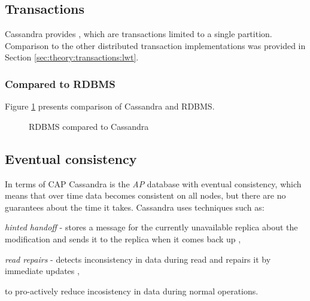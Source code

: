 \subsection{Transactions}
Cassandra provides \lwt, which are transactions limited to a single partition.
Comparison to the other distributed transaction implementations was provided in Section \ref{sec:theory:transactions:lwt}.

\subsubsection{Compared to RDBMS}
Figure \ref{fig:cassandraToRdbms} presents comparison of Cassandra and RDBMS.
\begin{figure}[H]
  \setlength{\unitlength}{1.3cm}  
  \caption{RDBMS compared to Cassandra}
  \label{fig:cassandraToRdbms}
\end{figure}

\subsection{Eventual consistency}\label{sec:theory:eventualConsistency}
In terms of CAP \cite{brewer2000towards} \cite{Brewer:2012ba} Cassandra is the \emph{AP} database with eventual consistency, which means that over time data becomes consistent on all nodes, but there are no guarantees about the time it takes. Cassandra uses techniques such as: \begin{enumerate*}[label=\alph*)]
\item \emph{hinted handoff} - stores a message for the currently unavailable replica about the modification and sends it to the replica when it comes back up \cite{CassandraHintedHandoff},  
\item \emph{read repairs} - detects inconsistency in data during read and repairs it by immediate updates \cite{CassandraReadRepair},  \end{enumerate*} to pro-actively reduce incosistency in data during normal operations.